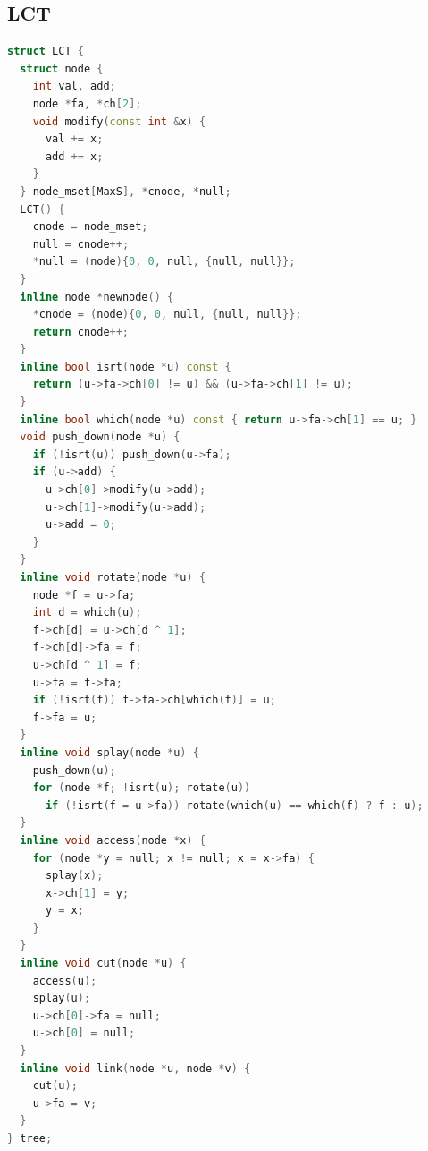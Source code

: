 \documentclass[twoside]{article}
\begin{document}
\subsection{LCT}
\begin{lstlisting}[language=c++]
struct LCT {
  struct node {
    int val, add;
    node *fa, *ch[2];
    void modify(const int &x) {
      val += x;
      add += x;
    }
  } node_mset[MaxS], *cnode, *null;
  LCT() {
    cnode = node_mset;
    null = cnode++;
    *null = (node){0, 0, null, {null, null}};
  }
  inline node *newnode() {
    *cnode = (node){0, 0, null, {null, null}};
    return cnode++;
  }
  inline bool isrt(node *u) const {
    return (u->fa->ch[0] != u) && (u->fa->ch[1] != u);
  }
  inline bool which(node *u) const { return u->fa->ch[1] == u; }
  void push_down(node *u) {
    if (!isrt(u)) push_down(u->fa);
    if (u->add) {
      u->ch[0]->modify(u->add);
      u->ch[1]->modify(u->add);
      u->add = 0;
    }
  }
  inline void rotate(node *u) {
    node *f = u->fa;
    int d = which(u);
    f->ch[d] = u->ch[d ^ 1];
    f->ch[d]->fa = f;
    u->ch[d ^ 1] = f;
    u->fa = f->fa;
    if (!isrt(f)) f->fa->ch[which(f)] = u;
    f->fa = u;
  }
  inline void splay(node *u) {
    push_down(u);
    for (node *f; !isrt(u); rotate(u))
      if (!isrt(f = u->fa)) rotate(which(u) == which(f) ? f : u);
  }
  inline void access(node *x) {
    for (node *y = null; x != null; x = x->fa) {
      splay(x);
      x->ch[1] = y;
      y = x;
    }
  }
  inline void cut(node *u) {
    access(u);
    splay(u);
    u->ch[0]->fa = null;
    u->ch[0] = null;
  }
  inline void link(node *u, node *v) {
    cut(u);
    u->fa = v;
  }
} tree;

\end{lstlisting}
\end{document}
